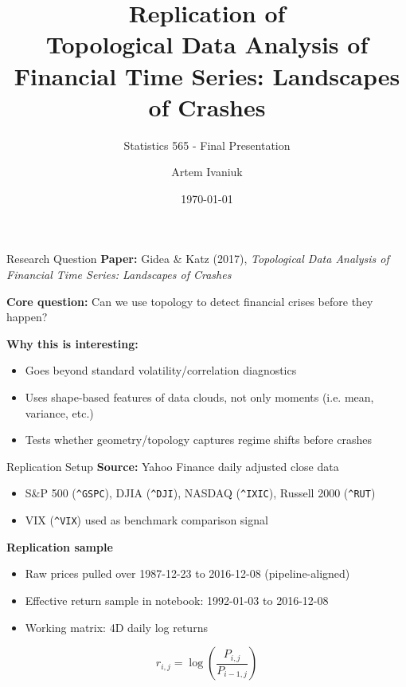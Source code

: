 \documentclass[aspectratio=169,10pt]{beamer}
\title[TDA Landscapes of Crashes]{Replication of \\ Topological Data Analysis of Financial Time Series: Landscapes of Crashes}
\subtitle{Statistics 565 - Final Presentation}
\author{Artem Ivaniuk}
\date{\today}
\begin{document}
\begin{frame}
  \titlepage
\end{frame}

\begin{frame}{Research Question}
\textbf{Paper:} Gidea $\&$ Katz (2017), \emph{Topological Data Analysis of Financial Time Series: Landscapes of Crashes}

\vspace{0.5em}
\textbf{Core question:} Can we use topology to detect financial crises before they happen?

\vspace{0.5em}
\textbf{Why this is interesting:}
\begin{itemize}
  \item Goes beyond standard volatility/correlation diagnostics 
  \item Uses shape-based features of data clouds, not only moments (i.e. mean, variance, etc.)
  \item Tests whether geometry/topology captures regime shifts before crashes
\end{itemize}
\end{frame}

\begin{frame}{Replication Setup}
\textbf{Source:} Yahoo Finance daily adjusted close data
\begin{itemize}
  \item S\&P 500 (\texttt{\^{}GSPC}), DJIA (\texttt{\^{}DJI}), NASDAQ (\texttt{\^{}IXIC}), Russell 2000 (\texttt{\^{}RUT})
  \item VIX (\texttt{\^{}VIX}) used as benchmark comparison signal
\end{itemize}

\vspace{0.4em}
\textbf{Replication sample}
\begin{itemize}
  \item Raw prices pulled over 1987-12-23 to 2016-12-08 (pipeline-aligned)
  \item Effective return sample in notebook: 1992-01-03 to 2016-12-08
  \item Working matrix: 4D daily log returns
\end{itemize}

\vspace{0.4em}
\[
r_{i,j} = \log\!\left(\frac{P_{i,j}}{P_{i-1,j}}\right)
\]
\end{frame}
\end{document}
